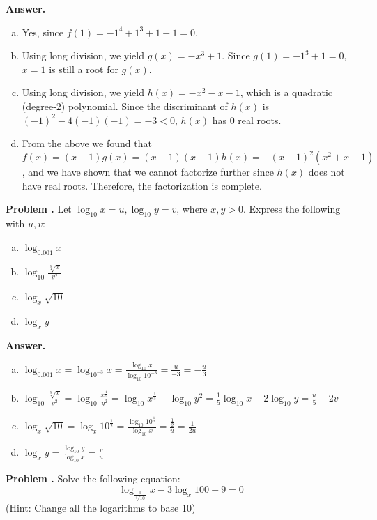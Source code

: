 \documentclass[11pt,letterpaper]{article}
\newcounter{problem}
\newcommand{\problem}{
	\stepcounter{problem}%
	\noindent \textbf{Problem \theproblem. }%
}
\newcommand{\answer}{\noindent \textbf{Answer. }}
\begin{document}
\answer
\begin{enumerate}[(a)]
	\item Yes, since $f(1) = -1^4+1^3+1-1 = 0$.
	\item Using long division, we yield $g(x) = -x^3+1$.  Since $g(1) = -1^3+1 = 0$, $x=1$ is still a root for $g(x)$.
	\item Using long division, we yield $h(x) = -x^2-x-1$, which is a quadratic (degree-$2$) polynomial.  Since the discriminant of $h(x)$ is $(-1)^2-4(-1)(-1) = -3 < 0$, $h(x)$ has $0$ real roots.
	\item From the above we found that $f(x) = (x-1)g(x) = (x-1)(x-1)h(x) = -(x-1)^2(x^2+x+1)$, and we have shown that we cannot factorize further since $h(x)$ does not have real roots.  Therefore, the factorization is complete.
\end{enumerate} \vspace{6mm}

\problem Let $\log_{10} x = u, \log_{10} y = v$, where $x, y > 0$. Express the following with $u, v$:
\begin{enumerate}[(a)]
\item $\log_{0.001}x$
\item $\log_{10}{\frac{\sqrt[5]{x}}{y^2}}$
\item $\log_{x}\sqrt{10}$
\item $\log_{x}y$
\end{enumerate} \vspace{6mm}

\answer
\begin{enumerate}[(a)]
\item $\log_{0.001}x = \log_{10^{-3}}x = \frac{\log_{10}x}{\log_{10}10^{-3}} = \frac{u}{-3} = -\frac{u}{3}$
\item $\log_{10}{\frac{\sqrt[5]{x}}{y^2}} = \log_{10}{\frac{x^{\frac{1}{5}}}{y^2}} =  \log_{10}x^{\frac{1}{5}} - \log_{10}y^2 = \frac{1}{5}\log_{10}x - 2\log_{10}y = \frac{u}{5}-2v$
\item $\log_{x}\sqrt{10} = \log_{x}10^{\frac{1}{2}} = \frac{\log_{10}10^{\frac{1}{2}}}{\log_{10}x} = \frac{\frac{1}{2}}{u} = \frac{1}{2u}$
\item $\log_{x}y = \frac{\log_{10}y}{\log_{10}x} = \frac{v}{u}$
\end{enumerate} \vspace{6mm}

\problem Solve the following equation:
\[\log_{\frac{1}{\sqrt[3]{10}}}x - 3\log_{x}100 - 9 = 0\]
(Hint: Change all the logarithms to base 10) \vspace{6mm}
\end{document}
